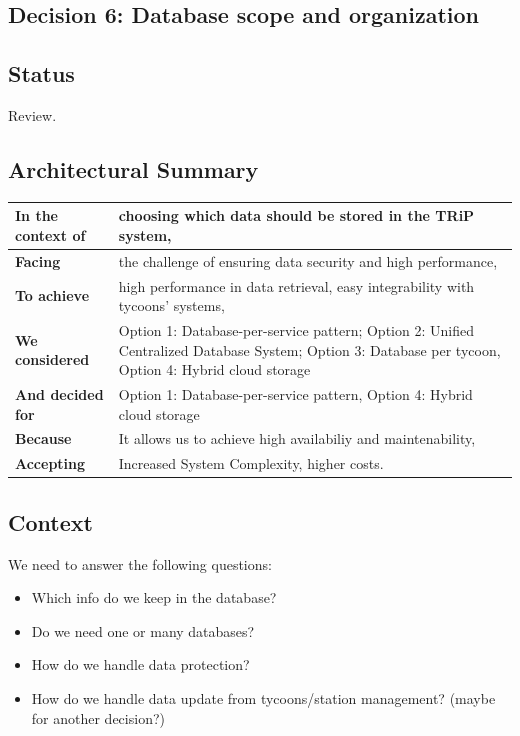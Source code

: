 \subsection{Decision 6: Database scope and organization}

\subsection*{Status}
Review.

\subsection*{Architectural Summary}
\begin{tabular}{|p{3.5cm}|p{10.5cm}|}
    \hline
    \textbf{In the context of} & choosing which data should be stored in the TRiP system, \\
    \hline
    \textbf{Facing} & the challenge of ensuring data security and high performance, \\
    \hline
    \textbf{To achieve} & high performance in data retrieval, easy integrability with tycoons' systems, \\
    \hline
    \textbf{We considered} & Option 1: Database-per-service pattern; Option 2: Unified Centralized Database System; Option 3: Database per tycoon, Option 4: Hybrid cloud storage\\
    \hline
    \textbf{And decided for} & Option 1: Database-per-service pattern, Option 4: Hybrid cloud storage \\
    \hline
    \textbf{Because} & It allows us to achieve high availabiliy and maintenability, \\
    \hline
    \textbf{Accepting} & Increased System Complexity, higher costs. \\
    \hline
\end{tabular}

\subsection*{Context}
We need to answer the following questions:
\begin{itemize}
\item Which info do we keep in the database? 
\item Do we need one or many databases?
\item How do we handle data protection?
\item How do we handle data update from tycoons/station management? (maybe for another decision?)
\end{itemize}

